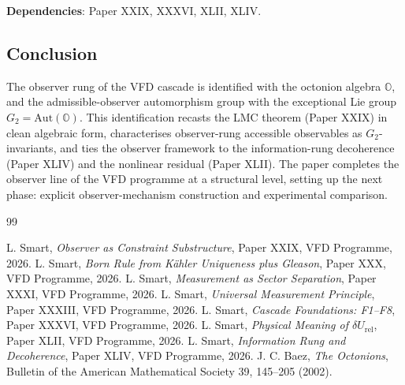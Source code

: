\documentclass[12pt]{article}
\theoremstyle{definition}
\theoremstyle{remark}
\newcommand{\Oo}{\mathbb{O}}
\newcommand{\Gtwo}{G_2}
\newcommand{\Aut}{\mathrm{Aut}}
\begin{document}
\textbf{Dependencies}: Paper XXIX, XXXVI, XLII, XLIV.

\subsection{Conclusion}

The observer rung of the VFD cascade is identified with the octonion algebra $\Oo$, and the admissible-observer automorphism group with the exceptional Lie group $\Gtwo = \Aut(\Oo)$. This identification recasts the LMC theorem (Paper XXIX) in clean algebraic form, characterises observer-rung accessible observables as $\Gtwo$-invariants, and ties the observer framework to the information-rung decoherence (Paper XLIV) and the nonlinear residual (Paper XLII). The paper completes the observer line of the VFD programme at a structural level, setting up the next phase: explicit observer-mechanism construction and experimental comparison.


\begin{thebibliography}{99}

 L. Smart, \emph{Observer as Constraint Substructure}, Paper XXIX, VFD Programme, 2026.
 L. Smart, \emph{Born Rule from K\"ahler Uniqueness plus Gleason}, Paper XXX, VFD Programme, 2026.
 L. Smart, \emph{Measurement as Sector Separation}, Paper XXXI, VFD Programme, 2026.
 L. Smart, \emph{Universal Measurement Principle}, Paper XXXIII, VFD Programme, 2026.
 L. Smart, \emph{Cascade Foundations: F1--F8}, Paper XXXVI, VFD Programme, 2026.
 L. Smart, \emph{Physical Meaning of $\delta U_{\mathrm{rel}}$}, Paper XLII, VFD Programme, 2026.
 L. Smart, \emph{Information Rung and Decoherence}, Paper XLIV, VFD Programme, 2026.
 J. C. Baez, \emph{The Octonions}, Bulletin of the American Mathematical Society 39, 145--205 (2002).

\end{thebibliography}
\end{document}
